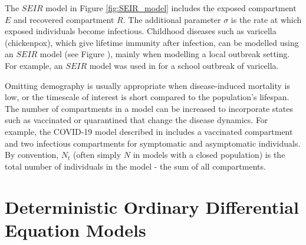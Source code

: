 The $SEIR$ model in Figure \ref{fig:SEIR_model} includes the
exposed compartment $E$ and recovered compartment $R.$ The additional
parameter $\sigma$ is the rate at which exposed individuals become
infectious.
Childhood diseases such as varicella (chickenpox), which give lifetime immunity
after infection, can be modelled using an $SEIR$ model (see Figure
), mainly when modelling a local outbreak setting.
For example, an $SEIR$ model was used in \cite{zha_research_2020} for a school
outbreak of varicella.

Omitting demography is usually appropriate when
disease-induced mortality is low, or the timescale of interest is short
compared to the population's lifespan.
The number of compartments in a model can be increased
to incorporate states such as
vaccinated or quarantined that change the disease dynamics.
For example, the COVID-19 model described in \cite{acuna-zegarra_covid-19_2021}
includes a vaccinated compartment and two infectious compartments for
symptomatic and asymptomatic individuals.
By convention, $N_t$ (often simply $N$ in models with a
closed population) is the total number of individuals in the model - the sum of
all compartments.

\section{Deterministic Ordinary Differential Equation Models}

